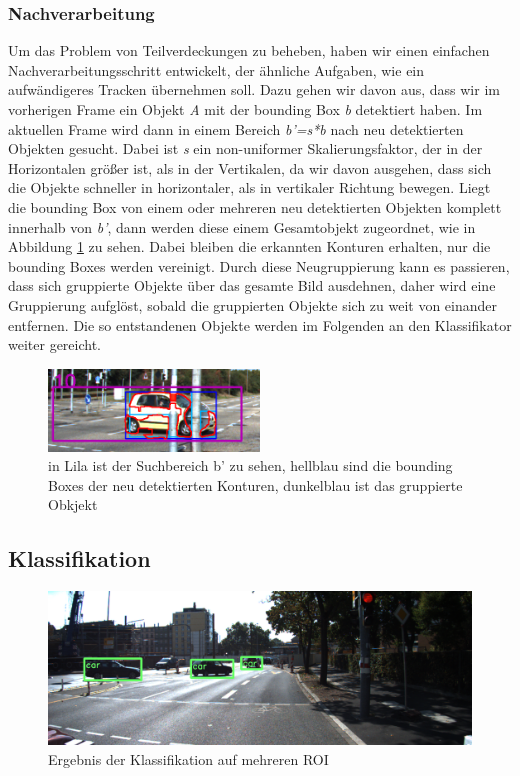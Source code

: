 \documentclass[conference]{IEEEtran}
\begin{document}
\subsubsection{Nachverarbeitung}
Um das Problem von Teilverdeckungen zu beheben, haben wir einen einfachen Nachverarbeitungsschritt entwickelt, der ähnliche Aufgaben, wie ein aufwändigeres Tracken übernehmen soll. Dazu gehen wir davon aus, dass wir im vorherigen Frame ein Objekt \textit{A} mit der bounding Box \textit{b} detektiert haben. Im aktuellen Frame wird dann in einem Bereich \textit{b'=s*b} nach neu detektierten Objekten gesucht. Dabei ist \textit{s} ein non-uniformer Skalierungsfaktor, der in der Horizontalen größer ist, als in der Vertikalen, da wir davon ausgehen, dass sich die Objekte schneller in horizontaler, als in vertikaler Richtung bewegen. Liegt die bounding Box von einem oder mehreren neu detektierten Objekten komplett innerhalb von \textit{b'}, dann werden diese einem Gesamtobjekt zugeordnet, wie in Abbildung \ref{fig:trainds01_nachverarbeitung} zu sehen. Dabei bleiben die erkannten Konturen erhalten, nur die bounding Boxes werden vereinigt. Durch diese Neugruppierung kann es passieren, dass sich gruppierte Objekte über das gesamte Bild ausdehnen, daher wird eine Gruppierung aufglöst, sobald die gruppierten Objekte sich zu weit von einander entfernen. Die so entstandenen Objekte werden im Folgenden an den Klassifikator weiter gereicht.

\begin{figure}
\centering
\includegraphics[width=0.5\textwidth]{./trainds01_nachverarbeitung}
\caption{in Lila ist der Suchbereich b' zu sehen, hellblau sind die bounding Boxes der neu detektierten Konturen, dunkelblau ist das gruppierte Obkjekt}
\label{fig:trainds01_nachverarbeitung}
\end{figure}

\subsection{Klassifikation}

\begin{figure}
\includegraphics[width=\textwidth]{ds03_car01}
\caption{Ergebnis der Klassifikation auf mehreren ROI}
\end{figure}
\end{document}
